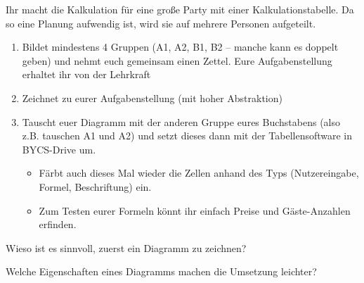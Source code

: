 {
    Ihr macht die Kalkulation für eine große Party mit einer Kalkulationstabelle. Da so eine Planung aufwendig ist, wird sie auf mehrere Personen aufgeteilt.
    \begin{enumerate}
        \item Bildet mindestens 4 Gruppen (A1, A2, B1, B2 – manche kann es doppelt geben) und nehmt euch gemeinsam einen Zettel. Eure Aufgabenstellung erhaltet ihr von der Lehrkraft 
        \item Zeichnet zu eurer Aufgabenstellung  (mit hoher Abstraktion)\\
        \item Tauscht euer Diagramm mit der anderen Gruppe eures Buchstabens (also z.B. tauschen A1 und A2) und setzt dieses dann mit der Tabellensoftware in BYCS-Drive um. \begin{itemize}
        \item Färbt auch dieses Mal wieder die Zellen anhand des Typs (Nutzereingabe, Formel, Beschriftung) ein.
            \item Zum Testen eurer Formeln könnt ihr einfach Preise und Gäste-Anzahlen erfinden.
        \end{itemize}
    \end{enumerate}

    Wieso ist es sinnvoll, zuerst ein Diagramm zu zeichnen?



    Welche Eigenschaften eines Diagramms machen die Umsetzung leichter?

}
